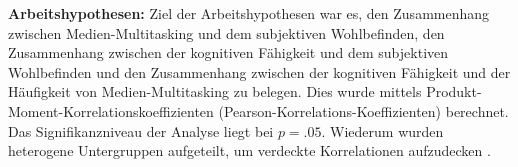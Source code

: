 \par
\textbf{Arbeitshypothesen:} Ziel der Arbeitshypothesen war es, den Zusammenhang zwischen Medien-Multitasking und dem subjektiven Wohlbefinden, den Zusammenhang zwischen der kognitiven Fähigkeit und dem subjektiven Wohlbefinden und den Zusammenhang zwischen der kognitiven Fähigkeit und der Häufigkeit von Medien-Multitasking zu belegen. Dies wurde mittels Produkt-Moment-Korrelationskoeffizienten (Pearson-Korrelations-Koeffizienten) berechnet. Das Signifikanzniveau der Analyse liegt bei $p=.05$. Wiederum wurden heterogene Untergruppen aufgeteilt, um verdeckte Korrelationen aufzudecken \cite{Ebermann2014}.


